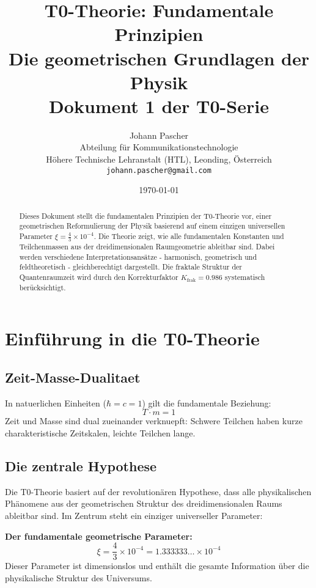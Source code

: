 \documentclass[12pt,a4paper]{article}
\title{\textbf{T0-Theorie: Fundamentale Prinzipien}\\[0.5cm]
	\large Die geometrischen Grundlagen der Physik\\[0.3cm]
	\normalsize Dokument 1 der T0-Serie}
\author{Johann Pascher\\
	Abteilung für Kommunikationstechnologie\\
	Höhere Technische Lehranstalt (HTL), Leonding, Österreich\\
	\texttt{johann.pascher@gmail.com}}
\date{\today}
\newcommand{\xipar}{\xi}
\newcommand{\Kfrak}{K_{\text{frak}}}
\begin{document}
	
	\maketitle
	
	\begin{abstract}
		Dieses Dokument stellt die fundamentalen Prinzipien der T0-Theorie vor, einer geometrischen Reformulierung der Physik basierend auf einem einzigen universellen Parameter $\xipar = \frac{4}{3} \times 10^{-4}$. Die Theorie zeigt, wie alle fundamentalen Konstanten und Teilchenmassen aus der dreidimensionalen Raumgeometrie ableitbar sind. Dabei werden verschiedene Interpretationsansätze - harmonisch, geometrisch und feldtheoretisch - gleichberechtigt dargestellt. Die fraktale Struktur der Quantenraumzeit wird durch den Korrekturfaktor $\Kfrak = 0.986$ systematisch berücksichtigt.
	\end{abstract}
	
	\tableofcontents
	\newpage
	
	\section{Einführung in die T0-Theorie}
		\subsection{Zeit-Masse-Dualitaet}
	
	
	In natuerlichen Einheiten ($\hbar = c = 1$) gilt die fundamentale Beziehung:
	\begin{equation}
		T \cdot m = 1
		\label{eq:time_mass_duality}
	\end{equation}
	Zeit und Masse sind dual zueinander verknuepft: Schwere Teilchen haben kurze charakteristische Zeitskalen, leichte Teilchen lange.
	\subsection{Die zentrale Hypothese}
	
	Die T0-Theorie basiert auf der revolutionären Hypothese, dass alle physikalischen Phänomene aus der geometrischen Struktur des dreidimensionalen Raums ableitbar sind. Im Zentrum steht ein einziger universeller Parameter:
	
	\begin{foundation}
		\textbf{Der fundamentale geometrische Parameter:}
		\begin{equation}
			\boxed{\xipar = \frac{4}{3} \times 10^{-4} = 1.333333\dots \times 10^{-4}}
			\label{eq:xi_fundamental}
		\end{equation}
		Dieser Parameter ist dimensionslos und enthält die gesamte Information über die physikalische Struktur des Universums.
	\end{foundation}
	
\end{document}
